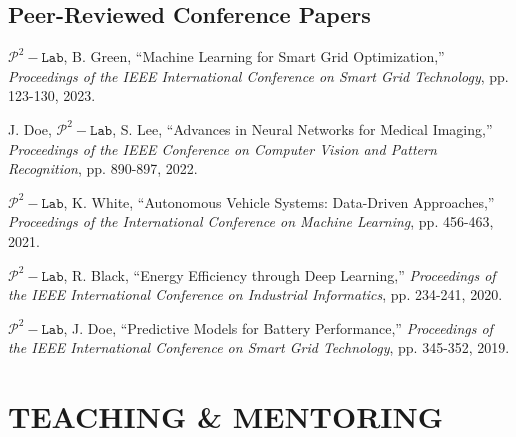 \documentclass[a4paper,11pt]{article}
\begin{document}
\subsection{Peer-Reviewed Conference Papers}
\begin{etaremune}[leftmargin=1cm,itemsep=0cm]
\renewcommand\labelenumi{[C\theenumi]}

\item \textbf{$\mathcal{P}^2-\texttt{Lab}$}, B. Green, ``Machine Learning for Smart Grid Optimization,'' \textit{Proceedings of the IEEE International Conference on Smart Grid Technology}, pp. 123-130, 2023.

\item J. Doe, \textbf{$\mathcal{P}^2-\texttt{Lab}$}, S. Lee, ``Advances in Neural Networks for Medical Imaging,'' \textit{Proceedings of the IEEE Conference on Computer Vision and Pattern Recognition}, pp. 890-897, 2022.

\item \textbf{$\mathcal{P}^2-\texttt{Lab}$}, K. White, ``Autonomous Vehicle Systems: Data-Driven Approaches,'' \textit{Proceedings of the International Conference on Machine Learning}, pp. 456-463, 2021.

\item \textbf{$\mathcal{P}^2-\texttt{Lab}$}, R. Black, ``Energy Efficiency through Deep Learning,'' \textit{Proceedings of the IEEE International Conference on Industrial Informatics}, pp. 234-241, 2020.

\item \textbf{$\mathcal{P}^2-\texttt{Lab}$}, J. Doe, ``Predictive Models for Battery Performance,'' \textit{Proceedings of the IEEE International Conference on Smart Grid Technology}, pp. 345-352, 2019.
\end{etaremune}


\newpage
\section{TEACHING \& MENTORING}
\end{document}

